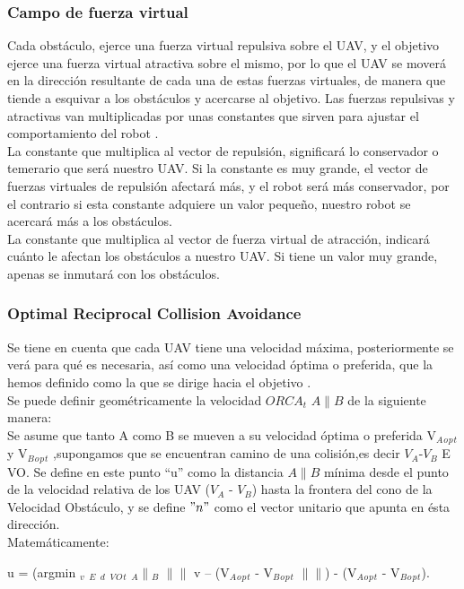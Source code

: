\subsubsection{Campo de fuerza virtual}
Cada obstáculo, ejerce una fuerza virtual repulsiva sobre el UAV, y el objetivo ejerce una fuerza virtual atractiva sobre el mismo, por lo que el UAV se moverá en la dirección resultante de cada una de estas fuerzas virtuales, de manera que tiende a esquivar a los obstáculos y acercarse al objetivo. Las fuerzas repulsivas y atractivas van multiplicadas por unas constantes que sirven para ajustar el comportamiento del robot \cite{the:algoritmos_evadir_obstaculos}.\\
La constante que multiplica al vector de repulsión, significará lo conservador o temerario que será nuestro UAV. Si la constante es muy grande, el vector de fuerzas virtuales de repulsión afectará más, y el robot será más conservador, por el contrario si esta constante adquiere un valor pequeño, nuestro robot se acercará más a los obstáculos.\\
La constante que multiplica al vector de fuerza virtual de atracción, indicará cuánto le afectan los obstáculos a nuestro UAV. Si tiene un valor muy grande, apenas se inmutará con los obstáculos.

\subsubsection{Optimal Reciprocal Collision Avoidance}
Se tiene en cuenta que cada UAV tiene una velocidad máxima, posteriormente se verá para qué es necesaria, así como una velocidad óptima o preferida, que la hemos definido como la que se dirige hacia el objetivo \cite{the:algoritmos_evadir_obstaculos}.\\
Se puede definir geométricamente la velocidad $ORCA_t$ $A\|B$ de la siguiente manera:\\
Se asume que tanto A como B se mueven a su velocidad óptima o preferida V$_A$$_o$$_p$$_t$ y V$_B$$_o$$_p$$_t$ ,supongamos que se encuentran camino de una colisión,es decir $V_A$-$V_B$ E VO.
Se define en este punto “u” como la distancia $A\|B$ mínima desde el punto de la velocidad relativa de los UAV ($V_A$ - $V_B$) hasta la frontera del cono de la Velocidad Obstáculo, y se define $"n"$ como el vector unitario que apunta en ésta dirección.\\
Matemáticamente:\\
\begin{center}
u = (argmin $_v$ $_E$ $_d$ $_V$$_O$$_t$ $_A$$\|$$_B$ $\|$$\|$ v – (V$_A$$_o$$_p$$_t$ - V$_B$$_o$$_p$$_t$ $\|$$\|$) - (V$_A$$_o$$_p$$_t$ - V$_B$$_o$$_p$$_t$).
\end{center}

